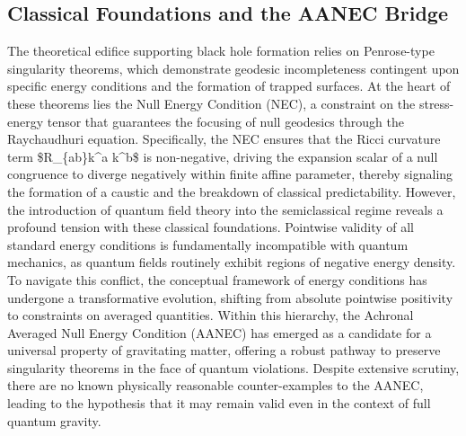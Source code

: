 \documentclass[conference]{IEEEtran}
\begin{document}
\subsection{Classical Foundations and the AANEC Bridge}
The theoretical edifice supporting black hole formation relies on Penrose-type singularity theorems, which demonstrate geodesic incompleteness contingent upon specific energy conditions and the formation of trapped surfaces. At the heart of these theorems lies the Null Energy Condition (NEC), a constraint on the stress-energy tensor that guarantees the focusing of null geodesics through the Raychaudhuri equation. Specifically, the NEC ensures that the Ricci curvature term \$R\_\{ab\}k\textasciicircum{}a k\textasciicircum{}b\$ is non-negative, driving the expansion scalar of a null congruence to diverge negatively within finite affine parameter, thereby signaling the formation of a caustic and the breakdown of classical predictability. However, the introduction of quantum field theory into the semiclassical regime reveals a profound tension with these classical foundations. Pointwise validity of all standard energy conditions is fundamentally incompatible with quantum mechanics, as quantum fields routinely exhibit regions of negative energy density. To navigate this conflict, the conceptual framework of energy conditions has undergone a transformative evolution, shifting from absolute pointwise positivity to constraints on averaged quantities. Within this hierarchy, the Achronal Averaged Null Energy Condition (AANEC) has emerged as a candidate for a universal property of gravitating matter, offering a robust pathway to preserve singularity theorems in the face of quantum violations. Despite extensive scrutiny, there are no known physically reasonable counter-examples to the AANEC, leading to the hypothesis that it may remain valid even in the context of full quantum gravity.~\cite{cite_0ed84243cf171bc4}
\end{document}

